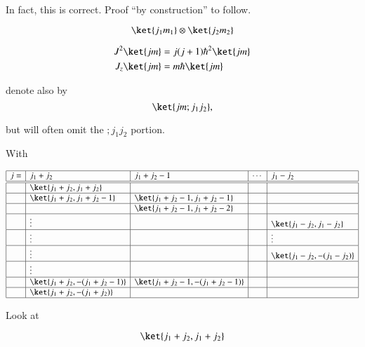 In fact, this is correct.  Proof ``by construction'' to follow.

\begin{equation}\label{eqn:qmTwoL17:500}
\ket{j_1 m_1} 
\otimes
\ket{j_2 m_2} 
\end{equation}

\begin{align}\label{eqn:qmTwoL17:520}
J^2 \ket{j m} &= j (j+1) \hbar^2 \ket{j m} \\
J_z \ket{j m} &= m \hbar \ket{j m}
\end{align}

denote also by
\begin{equation}\label{eqn:qmTwoL17:540}
\ket{j m ; j_1 j_2},
\end{equation}

but will often omit the $; j_1 j_2$ portion.

With 

\begin{equation}\label{eqn:qmTwoL17:560}
\begin{array}{| l | l | l | l | l |}
\hline
j = & j_1 + j_2				& j_1 + j_2 -1 				& \cdots 	& j_1 - j_2 \\
\hline
\hline
  &  \ket{j_1 + j_2, j_1 + j_2}	 	&					& 		& \\
\hline
  &  \ket{j_1 + j_2, j_1 + j_2 - 1}	&  \ket{j_1 + j_2 - 1, j_1 + j_2 - 1}	& 		& \\
\hline
  &                                     & \ket{j_1 + j_2 - 1, j_1 + j_2 - 2}	& 		& \\
\hline
  & \vdots 	 			&					& 		& \ket{j_1 - j_2, j_1 - j_2} \\
\hline
  & \vdots 	 			&					& 		& \vdots \\
\hline
  & \vdots 	 			&					& 		& \ket{j_1 - j_2, -(j_1 - j_2)} \\
\hline
  & \vdots 	 			&					& 		& \\
\hline
  &  \ket{j_1 + j_2, -(j_1 + j_2 - 1)}	& \ket{j_1 + j_2 -1, -(j_1 + j_2 - 1)}	& 		& \\
\hline
  &  \ket{j_1 + j_2, -(j_1 + j_2)}	&					& 		&  \\
\hline
\end{array}
\end{equation}

Look at 

\begin{equation}\label{eqn:qmTwoL17:580}
\ket{j_1 + j_2, j_1 + j_2}
\end{equation}

